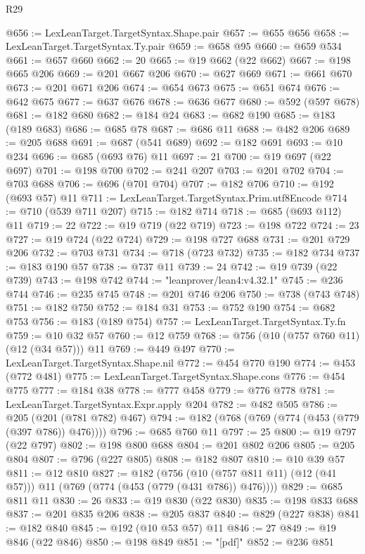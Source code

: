 \begin{lexlean}{R29}
\begin{coremodule}
@656 := LexLeanTarget.TargetSyntax.Shape.pair
@657 := @655 @656
@658 := LexLeanTarget.TargetSyntax.Ty.pair
@659 := @658 @95
@660 := @659 @534
@661 := @657 @660
@662 := 20
@665 := @19 @662 (@22 @662)
@667 := @198 @665 @206
@669 := @201 @667 @206
@670 := @627 @669
@671 := @661 @670
@673 := @201 @671 @206
@674 := @654 @673
@675 := @651 @674
@676 := @642 @675
@677 := @637 @676
@678 := @636 @677
@680 := @592 (@597 @678)
@681 := @182 @680
@682 := @184 @24
@683 := @682 @190
@685 := @183 (@189 @683)
@686 := @685 @78
@687 := @686 @11
@688 := @482 @206
@689 := @205 @688
@691 := @687 (@541 @689)
@692 := @182 @691
@693 := @10 @234
@696 := @685 (@693 @76) @11
@697 := 21
@700 := @19 @697 (@22 @697)
@701 := @198 @700
@702 := @241 @207
@703 := @201 @702
@704 := @703 @688
@706 := @696 (@701 @704)
@707 := @182 @706
@710 := @192 (@693 @57) @11
@711 := LexLeanTarget.TargetSyntax.Prim.utf8Encode
@714 := @710 (@539 @711 @207)
@715 := @182 @714
@718 := @685 (@693 @112) @11
@719 := 22
@722 := @19 @719 (@22 @719)
@723 := @198 @722
@724 := 23
@727 := @19 @724 (@22 @724)
@729 := @198 @727 @688
@731 := @201 @729 @206
@732 := @703 @731
@734 := @718 (@723 @732)
@735 := @182 @734
@737 := @183 @190 @57
@738 := @737 @11
@739 := 24
@742 := @19 @739 (@22 @739)
@743 := @198 @742
@744 := "leanprover/lean4:v4.32.1"
@745 := @236 @744
@746 := @235 @745
@748 := @201 @746 @206
@750 := @738 (@743 @748)
@751 := @182 @750
@752 := @184 @31
@753 := @752 @190
@754 := @682 @753
@756 := @183 (@189 @754)
@757 := LexLeanTarget.TargetSyntax.Ty.fn
@759 := @10 @32 @57
@760 := @12 @759
@768 := @756 (@10 (@757 @760 @11) (@12 (@34 @57))) @11
@769 := @449 @497
@770 := LexLeanTarget.TargetSyntax.Shape.nil
@772 := @454 @770 @190
@774 := @453 (@772 @481)
@775 := LexLeanTarget.TargetSyntax.Shape.cons
@776 := @454 @775
@777 := @184 @38
@778 := @777 @458
@779 := @776 @778
@781 := LexLeanTarget.TargetSyntax.Expr.apply @204
@782 := @482 @505
@786 := @205 (@201 (@781 @782) @467)
@794 := @182 (@768 (@769 (@774 (@453 (@779 (@397 @786)) @476))))
@796 := @685 @760 @11
@797 := 25
@800 := @19 @797 (@22 @797)
@802 := @198 @800 @688
@804 := @201 @802 @206
@805 := @205 @804
@807 := @796 (@227 @805)
@808 := @182 @807
@810 := @10 @39 @57
@811 := @12 @810
@827 := @182
    (@756 (@10 (@757 @811 @11) (@12 (@41 @57))) @11 (@769 (@774 (@453 (@779 (@431 @786)) @476))))
@829 := @685 @811 @11
@830 := 26
@833 := @19 @830 (@22 @830)
@835 := @198 @833 @688
@837 := @201 @835 @206
@838 := @205 @837
@840 := @829 (@227 @838)
@841 := @182 @840
@845 := @192 (@10 @53 @57) @11
@846 := 27
@849 := @19 @846 (@22 @846)
@850 := @198 @849
@851 := "[pdf]"
@852 := @236 @851

\end{coremodule}
\end{lexlean}
